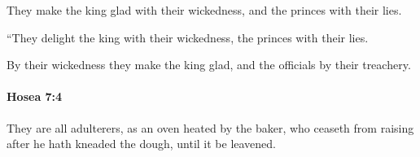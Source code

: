 			\begin{versebox}
					\item[BHS] 
					\item[LXX] 
					\item[ASV] They make the king glad with their wickedness, and the princes with their lies.
					\item[NIV] “They delight the king with their wickedness, the princes with their lies.
					\item[NRSV] By their wickedness they make the king glad, and the officials by their treachery.
			\end{versebox}

		\paragraph{Hosea 7:4} %
			\label{HOSEA-7-4}

			They are all adulterers, as an oven heated by the baker, who ceaseth from raising after he hath kneaded the dough, until it be leavened.

